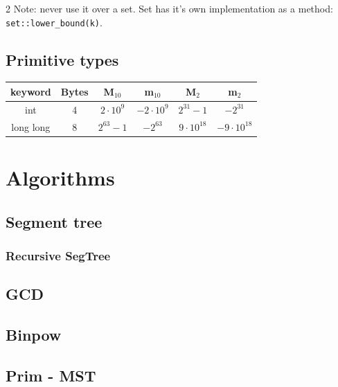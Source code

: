 \documentclass[8pt, letterpaper]{article}
\begin{document}
\begin{multicols}{2}
Note: never use it over a set. Set has it's own implementation as a method: \verb|set::lower_bound(k)|.


\subsection{Primitive types}

\begin{center}
\begin{tabular}{ |c|c|c|c|c|c| }
 \hline
 \textbf{keyword} & \textbf{Bytes} & \textbf{M$_{10}$} & \textbf{m$_{10}$} & \textbf{M$_{2}$} & \textbf{m$_{2}$}\\
 \hline
 int & 4 & $2\cdot 10^9$ & $-2\cdot 10^9$ & $2^{31} - 1$ & $-2^{31}$ \\
 \hline
 long long & 8 & $2^{63} - 1$ & $-2^{63}$ & $9\cdot10^{18}$ & $-9\cdot10^{18}$ \\
 \hline
\end{tabular}
\end{center}




%

\section{Algorithms}

\subsection{Segment tree}
\subsubsection{Recursive SegTree}



\subsection{GCD}


\subsection{Binpow}


\subsection{Prim - MST}



\end{multicols}
\end{document}
